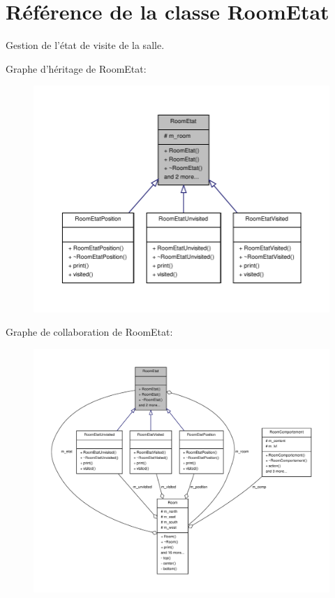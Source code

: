\hypertarget{class_room_etat}{\section{Référence de la classe Room\-Etat}
\label{class_room_etat}
}


Gestion de l'état de visite de la salle.  




Graphe d'héritage de Room\-Etat\-:
\nopagebreak
\begin{figure}[H]
\begin{center}
\leavevmode
\includegraphics[width=350pt]{class_room_etat__inherit__graph}
\end{center}
\end{figure}


Graphe de collaboration de Room\-Etat\-:
\nopagebreak
\begin{figure}[H]
\begin{center}
\leavevmode
\includegraphics[width=350pt]{class_room_etat__coll__graph}
\end{center}
\end{figure}

